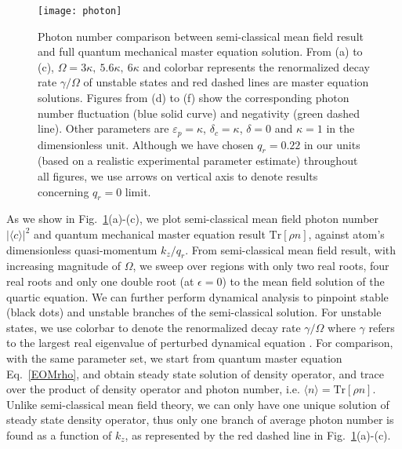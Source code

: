 \documentclass[atoms,article,submit,moreauthors,pdftex,12pt,a4paper]{mdpi}
\begin{document}
\begin{figure}[htp]
\texttt{[image: photon]}
\caption{ Photon number comparison between semi-classical mean field result and full quantum mechanical master equation solution. From (a) to (c), $\Omega = 3\kappa,\ 5.6\kappa,\ 6\kappa$ and colorbar represents the renormalized decay rate $\gamma/\Omega$ of unstable states and red dashed lines are master equation solutions. Figures from (d) to (f) show the corresponding photon number fluctuation (blue solid curve) and negativity (green dashed line). Other parameters are $\varepsilon_p=\kappa$, $\delta_c=\kappa$, $\delta=0$ and $\kappa=1$ in the dimensionless unit. Although we have chosen $q_r=0.22$ in our units (based on a realistic experimental parameter estimate) throughout all figures, we use arrows on vertical axis to denote results concerning $q_r=0$ limit. 
}
\label{photon}
\end{figure}

As we show in Fig.~\ref{photon}(a)-(c), we plot semi-classical mean field  photon number $|\langle c\rangle|^2$ and quantum mechanical master equation result $\text{Tr}[\rho n]$, against atom's dimensionless quasi-momentum $k_z/q_r$. From semi-classical mean field result, with increasing magnitude of $\Omega$, we sweep over regions with only two real roots, four real roots and only one double root (at $\epsilon=0$) to the mean field solution of the quartic equation. We can further perform dynamical analysis \cite{cavitySOC} to pinpoint stable (black dots) and unstable branches of the semi-classical solution. For unstable states, we use colorbar to denote the renormalized decay rate $\gamma/\Omega$ where $\gamma$ refers to the largest real eigenvalue of perturbed dynamical equation \cite{cavitySOC}. 
For comparison, with the same parameter set, we start from quantum master equation Eq.~\ref{EOMrho}, and obtain steady state solution of density operator, and trace over the product of density operator and photon number, i.e. $\langle n\rangle=\text{Tr}[\rho n]$. Unlike semi-classical mean field theory, we can only have one unique solution of steady state density operator, thus only one branch of average photon number is found as a function of $k_z$, as represented by the red dashed line in  Fig.~\ref{photon}(a)-(c).
\end{document}
